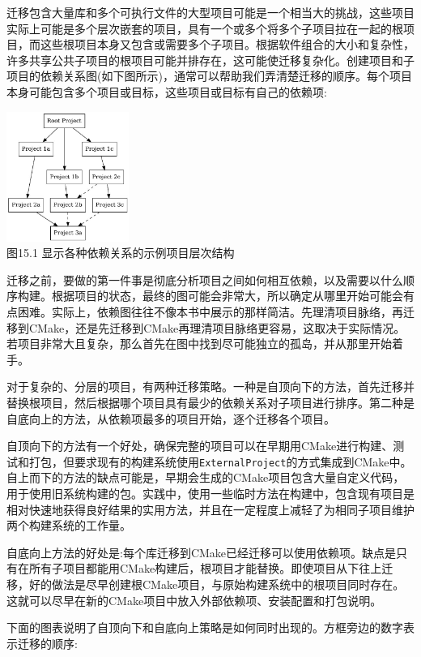 
迁移包含大量库和多个可执行文件的大型项目可能是一个相当大的挑战，这些项目实际上可能是多个层次嵌套的项目，具有一个或多个将多个子项目拉在一起的根项目，而这些根项目本身又包含或需要多个子项目。根据软件组合的大小和复杂性，许多共享公共子项目的根项目可能并排存在，这可能使迁移复杂化。创建项目和子项目的依赖关系图(如下图所示)，通常可以帮助我们弄清楚迁移的顺序。每个项目本身可能包含多个项目或目标，这些项目或目标有自己的依赖项:

\begin{center}
\includegraphics[width=0.3\textwidth]{content/3/chapter15/images/1.jpg}\\
图15.1 显示各种依赖关系的示例项目层次结构
\end{center}

迁移之前，要做的第一件事是彻底分析项目之间如何相互依赖，以及需要以什么顺序构建。根据项目的状态，最终的图可能会非常大，所以确定从哪里开始可能会有点困难。实际上，依赖图往往不像本书中展示的那样简洁。先理清项目脉络，再迁移到CMake，还是先迁移到CMake再理清项目脉络更容易，这取决于实际情况。若项目非常大且复杂，那么首先在图中找到尽可能独立的孤岛，并从那里开始着手。

对于复杂的、分层的项目，有两种迁移策略。一种是自顶向下的方法，首先迁移并替换根项目，然后根据哪个项目具有最少的依赖关系对子项目进行排序。第二种是自底向上的方法，从依赖项最多的项目开始，逐个迁移各个项目。

自顶向下的方法有一个好处，确保完整的项目可以在早期用CMake进行构建、测试和打包，但要求现有的构建系统使用\texttt{ExternalProject}的方式集成到CMake中。自上而下的方法的缺点可能是，早期会生成的CMake项目包含大量自定义代码，用于使用旧系统构建的包。实践中，使用一些临时方法在构建中，包含现有项目是相对快速地获得良好结果的实用方法，并且在一定程度上减轻了为相同子项目维护两个构建系统的工作量。

自底向上方法的好处是:每个库迁移到CMake已经迁移可以使用依赖项。缺点是只有在所有子项目都能用CMake构建后，根项目才能替换。即使项目从下往上迁移，好的做法是尽早创建根CMake项目，与原始构建系统中的根项目同时存在。这就可以尽早在新的CMake项目中放入外部依赖项、安装配置和打包说明。

下面的图表说明了自顶向下和自底向上策略是如何同时出现的。方框旁边的数字表示迁移的顺序:

